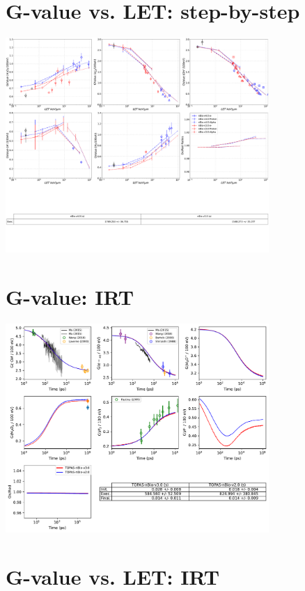 \documentclass[aspectratio=1610]{beamer}
\begin{document}
\section{G-value vs. LET: step-by-step}

\begin{frame}{\secname}
 \centering
   \includegraphics[width=0.75\textwidth]{./Gvalue_LET-SBS/Gvalue_LET-SBS}
\end{frame}

\section{G-value: IRT}

\begin{frame}{\secname}
 \centering
  \includegraphics[width=0.75\textwidth]{./GvalueIRT/GvalueIRT}

\end{frame}

\section{G-value vs. LET: IRT}
\end{document}
